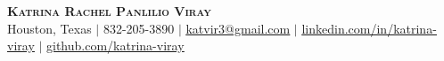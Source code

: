 \begin{center}
	\textbf{\Huge \scshape Katrina Rachel Panlilio Viray} \\ \vspace{1pt}
		\small Houston, Texas $|$
		\small 832-205-3890 $|$
		\href{mailto:katvir3@gmail.com}{\underline{katvir3@gmail.com}} $|$
		\href{https://www.linkedin.com/in/katrina-viray}{\underline{linkedin.com/in/katrina-viray}} $|$
		\href{https://github.com/katrina-viray}{\underline{github.com/katrina-viray}}
	\end{center}